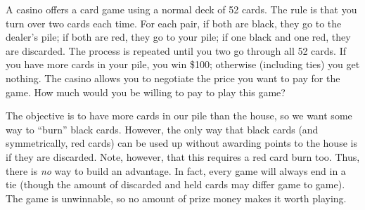 \begin{problem}
A casino offers a card game using a normal deck of 52 cards. The rule is that you turn
over two cards each time. For each pair, if both are black, they go to the dealer's pile; if
both are red, they go to your pile; if one black and one red, they are discarded. The
process is repeated until you two go through all 52 cards. If you have more cards in your
pile, you win \$100; otherwise (including ties) you get nothing. The casino allows you to
negotiate the price you want to pay for the game. How much would you be willing to
pay to play this game?
\end{problem}

\begin{solution}
The objective is to have more cards in our pile than the house, so we want some way to ``burn'' black cards. However, the only way that black cards (and symmetrically, red cards) can be used up without awarding points to the house is if they are discarded. Note, however, that this requires a red card burn too. Thus, there is \textit{no} way to build an advantage. In fact, every game will always end in a tie (though the amount of discarded and held cards may differ game to game). The game is unwinnable, so no amount of prize money makes it worth playing. 
\end{solution}

\newpage

\begin{problem}

\end{problem}